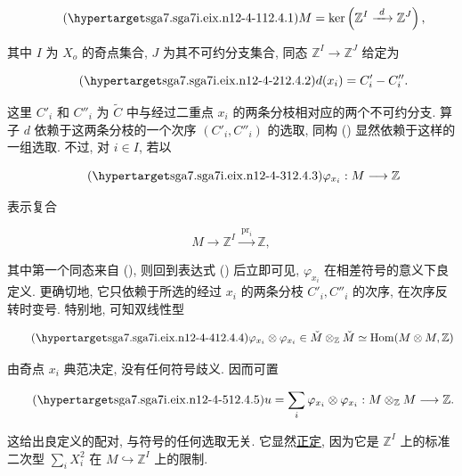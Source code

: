 \begin{equation}\tag{\SGARefTarget{sga7.sga7i.eix.n12-4-1}{12.4.1}}
 M=\ker\left(\mathbb Z^I\xrightarrow{\ d\ }\mathbb Z^J\right),
\end{equation}

\noindent
其中 $I$ 为 $X_o$ 的奇点集合, $J$ 为其不可约分支集合, 同态 $\mathbb Z^I\to\mathbb Z^J$ 给定为

\begin{equation}\tag{\SGARefTarget{sga7.sga7i.eix.n12-4-2}{12.4.2}}
 d(x_i)=C'_i-C''_i.
\end{equation}

这里 $C'_i$ 和 $C''_i$ 为 $\widetilde C$ 中与经过二重点 $x_i$ 的两条分枝相对应的两个不可约分支. 算子 $d$ 依赖于这两条分枝的一个次序 $(C'_i,C''_i)$ 的选取, 同构 () 显然依赖于这样的一组选取. 不过, 对 $i\in I$, 若以

\begin{equation}\tag{\SGARefTarget{sga7.sga7i.eix.n12-4-3}{12.4.3}}
 \varphi_{x_i}:M\longrightarrow\mathbb Z
\end{equation}

\noindent
表示复合

\begin{equation*}
 M\longrightarrow\mathbb Z^I
   \xrightarrow{\ \operatorname{pr}_i\ }\mathbb Z,
\end{equation*}

\noindent
其中第一个同态来自 (), 则回到表达式 () 后立即可见, $\varphi_{x_i}$ 在相差符号的意义下良定义. 更确切地, 它只依赖于所选的经过 $x_i$ 的两条分枝 $C'_i,C''_i$ 的次序, 在次序反转时变号. 特别地, 可知双线性型

\begin{equation}\tag{\SGARefTarget{sga7.sga7i.eix.n12-4-4}{12.4.4}}
 \varphi_{x_i}\otimes\varphi_{x_i}
 \in \check M\otimes_{\mathbb Z}\check M
 \simeq\operatorname{Hom}(M\otimes M,\mathbb Z)
\end{equation}

\noindent
由奇点 $x_i$ 典范决定, 没有任何符号歧义. 因而可置

\begin{equation}\tag{\SGARefTarget{sga7.sga7i.eix.n12-4-5}{12.4.5}}
 u=\sum_i\varphi_{x_i}\otimes\varphi_{x_i}:
 M\otimes_{\mathbb Z}M\longrightarrow\mathbb Z.
\end{equation}

这给出良定义的配对, 与符号的任何选取无关. 它显然\underline{正定}, 因为它是 $\mathbb Z^I$ 上的标准二次型 $\sum_i X_i^2$ 在 $M\hookrightarrow\mathbb Z^I$ 上的限制.

